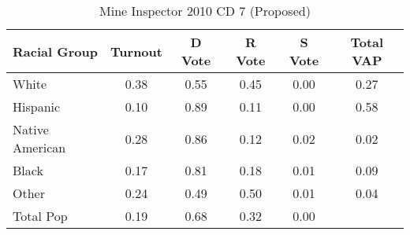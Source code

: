 \begin{table}[htb]
\begin{center}
\caption{Mine Inspector 2010 CD 7 (Proposed)}
\label{smine_vap_cd_7}
\begin{tabular}{lccccc}
  \hline
Racial Group & Turnout & D Vote & R Vote & S Vote & Total VAP \\ 
  \hline
White & 0.38 & 0.55 & 0.45 & 0.00 & 0.27 \\ 
  Hispanic & 0.10 & 0.89 & 0.11 & 0.00 & 0.58 \\ 
  Native American & 0.28 & 0.86 & 0.12 & 0.02 & 0.02 \\ 
  Black & 0.17 & 0.81 & 0.18 & 0.01 & 0.09 \\ 
  Other & 0.24 & 0.49 & 0.50 & 0.01 & 0.04 \\ 
  Total Pop & 0.19 & 0.68 & 0.32 & 0.00 &  \\ 
   \hline
\end{tabular}
\end{center}
\end{table}

